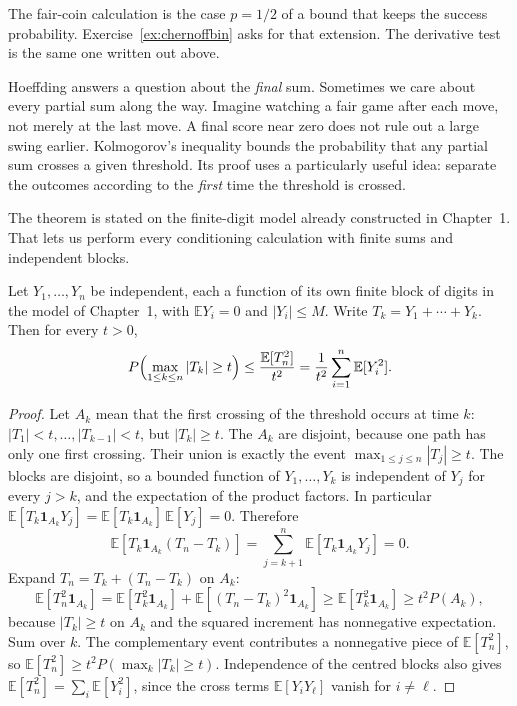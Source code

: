 The fair-coin calculation is the case $p=1/2$ of a bound that keeps the success probability. Exercise~\ref{ex:chernoffbin} asks for that extension. The derivative test is the same one written out above.

Hoeffding answers a question about the \emph{final} sum. Sometimes we care about every partial sum along the way. Imagine watching a fair game after each move, not merely at the last move. A final score near zero does not rule out a large swing earlier. Kolmogorov's inequality bounds the probability that any partial sum crosses a given threshold. Its proof uses a particularly useful idea: separate the outcomes according to the \emph{first} time the threshold is crossed.

The theorem is stated on the finite-digit model already constructed in Chapter~1. That lets us perform every conditioning calculation with finite sums and independent blocks.

\begin{theorem}\label{thm:kolmogorov}
Let $Y_1,\ldots,Y_n$ be independent, each a function of its own finite block of digits in the model of Chapter~1, with $\mathbb E Y_i=0$ and $|Y_i|\le M$. Write $T_k=Y_1+\cdots+Y_k$. Then for every $t>0$,
\[
 P\Bigl(\max_{1\le k\le n}|T_k|\ge t\Bigr)\le\frac{\mathbb E[T_n^2]}{t^2}=\frac1{t^2}\sum_{i=1}^n\mathbb E[Y_i^2].
\]
\end{theorem}
\begin{proof}
Let $A_k$ mean that the first crossing of the threshold occurs at time $k$: $|T_1|<t,\ldots,|T_{k-1}|<t$, but $|T_k|\ge t$. The $A_k$ are disjoint, because one path has only one first crossing. Their union is exactly the event $\max_{1\le j\le n}|T_j|\ge t$. The blocks are disjoint, so a bounded function of $Y_1,\ldots,Y_k$ is independent of $Y_j$ for every $j>k$, and the expectation of the product factors. In particular $\mathbb E[T_k\mathbf 1_{A_k}Y_j]=\mathbb E[T_k\mathbf 1_{A_k}]\,\mathbb E[Y_j]=0$. Therefore
\[
 \mathbb E[T_k\mathbf 1_{A_k}(T_n-T_k)]=\sum_{j=k+1}^n\mathbb E[T_k\mathbf 1_{A_k}Y_j]=0.
\]
Expand $T_n=T_k+(T_n-T_k)$ on $A_k$:
\[
 \mathbb E[T_n^2\mathbf 1_{A_k}]
 =\mathbb E[T_k^2\mathbf 1_{A_k}]+\mathbb E[(T_n-T_k)^2\mathbf 1_{A_k}]
 \ge\mathbb E[T_k^2\mathbf 1_{A_k}]\ge t^2 P(A_k),
\]
because $|T_k|\ge t$ on $A_k$ and the squared increment has nonnegative expectation. Sum over $k$. The complementary event contributes a nonnegative piece of $\mathbb E[T_n^2]$, so $\mathbb E[T_n^2]\ge t^2 P(\max_k|T_k|\ge t)$. Independence of the centred blocks also gives $\mathbb E[T_n^2]=\sum_i\mathbb E[Y_i^2]$, since the cross terms $\mathbb E[Y_i Y_\ell]$ vanish for $i\ne\ell$.
\end{proof}


